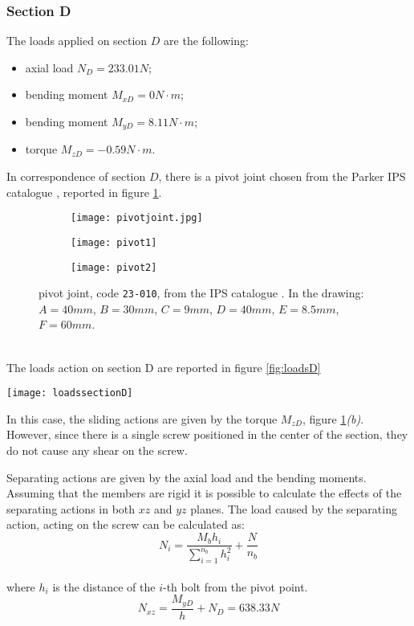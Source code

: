 \subsubsection*{Section D}
The loads applied on section $D$ are the following:
\begin{itemize}
	\item axial load $N_{D} = 233.01 N$;
	\item bending moment $M_{xD} = 0 N\cdot m$; 
	\item bending moment $M_{yD} = 8.11 N\cdot m$; 
	\item torque $M_{zD} = -0.59 N\cdot m$.
\end{itemize}
In correspondence of section $D$, there is a pivot joint chosen from the Parker IPS catalogue \cite{parker-ds}, reported in figure \ref{fig:pivot}.
\begin{figure}[h!]
    \centering
    \begin{subfigure}{0.32\linewidth}
    	\centering \texttt{[image: pivotjoint.jpg]}
    \end{subfigure}
	\begin{subfigure}{0.32\linewidth}
		\centering \texttt{[image: pivot1]} 
	\end{subfigure}
	\begin{subfigure}{0.32\linewidth}
		\centering \texttt{[image: pivot2]}
	\end{subfigure}    
    \caption{pivot joint, code \texttt{23-010}, from the IPS catalogue \cite{parker-ds}. In the drawing: $A = 40mm$, $B=30mm$, $C=9mm$, $D=40mm$, $E=8.5mm$, $F=60mm$.}
    \label{fig:pivot}
\end{figure}\\
The loads action on section D are reported in figure \ref{fig:loadsD}
\begin{SCfigure}[1.5][h!]
	\centering
	\texttt{[image: loadssectionD]}
	\caption{loads acting on section D}
	\label{fig:loadsD}
\end{SCfigure}

In this case, the sliding actions are given by the torque $M_{zD}$,  figure \ref{fig:pivot}\textit{(b)}. However, since there is a single screw positioned in the center of the section, they do not cause any shear on the screw.

Separating actions are given by the axial load and the bending moments. Assuming that the members are rigid it is possible to calculate the effects of the separating actions in both $xz$ and $yz$ planes. The load caused by the separating action, acting on the screw can be calculated as:
\begin{equation*}
    N_{i} = \frac{M_{b}h_{i}}{\sum\limits_{i=1}^{n_{b}} h^2_{i}} + \frac{N}{n_{b}}
\end{equation*}\\
where $h_{i}$ is the distance of the $i$-th bolt from the pivot point.
\begin{equation*}
    N_{xz} = \frac{M_{yD}}{h} + N_{D} = 638.33 N
\end{equation*}

